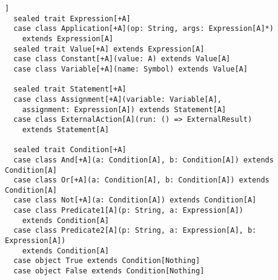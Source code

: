 \begin{lstlisting}[style=floating, label=lst:expressions,
  caption={Simplified definitions of all \abbrev{AST} classes in the \lstinline|expressions|
    sub-package.}]]
  sealed trait Expression[+A]
  case class Application[+A](op: String, args: Expression[A]*) 
    extends Expression[A]
  sealed trait Value[+A] extends Expression[A]
  case class Constant[+A](value: A) extends Value[A]
  case class Variable[+A](name: Symbol) extends Value[A]

  sealed trait Statement[+A]
  case class Assignment[+A](variable: Variable[A], 
    assignment: Expression[A]) extends Statement[A]
  case class ExternalAction[A](run: () => ExternalResult)
    extends Statement[A]

  sealed trait Condition[+A]
  case class And[+A](a: Condition[A], b: Condition[A]) extends Condition[A]
  case class Or[+A](a: Condition[A], b: Condition[A]) extends Condition[A]
  case class Not[+A](a: Condition[A]) extends Condition[A]
  case class Predicate1[A](p: String, a: Expression[A]) 
    extends Condition[A]
  case class Predicate2[A](p: String, a: Expression[A], b: Expression[A])
    extends Condition[A]
  case object True extends Condition[Nothing]
  case object False extends Condition[Nothing]
\end{lstlisting}

